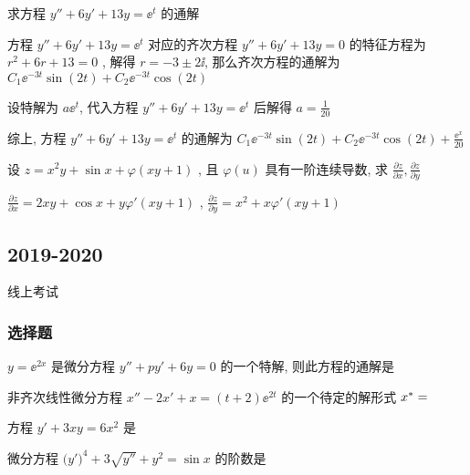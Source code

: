 \begin{ti}
	求方程 $y''+6y'+13y=\ee^t$ 的通解
	\begin{solution}
		方程 $y''+6y'+13y=\ee^t$ 对应的齐次方程 $y''+6y'+13y=0$ 的特征方程为 $r^2+6r+13=0$ , 解得 $r=-3\pm2\ii$, 那么齐次方程的通解为 $C_1\ee^{-3t}\sin(2t)+C_2\ee^{-3t}\cos(2t)$
		
		设特解为 $a\ee^{t}$, 代入方程 $y''+6y'+13y=\ee^t$ 后解得 $a=\frac{1}{20}$
		
		综上, 方程 $y''+6y'+13y=\ee^t$ 的通解为 $C_1\ee^{-3t}\sin(2t)+C_2\ee^{-3t}\cos(2t)+\frac{\ee^x}{20}$
	\end{solution}
\end{ti}

\begin{ti}
	设 $z=x^2y+\sin x+\varphi(xy+1)$ , 且 $\varphi(u)$ 具有一阶连续导数, 求 $\frac{\partial z}{\partial x},\frac{\partial z}{\partial y}$
	\begin{solution}
		$\frac{\partial z}{\partial x}=2xy+\cos x+y\varphi'(xy+1)$ , $\frac{\partial z}{\partial y}=x^2+x\varphi'(xy+1)$
	\end{solution}
\end{ti}

\subsection{2019-2020}
线上考试
\subsubsection{选择题}
\begin{ti}
	$y = \ee^{2x}$ 是微分方程 $y'' + py' + 6y = 0$ 的一个特解, 则此方程的通解是 \kuo
\end{ti}

\begin{ti}
	非齐次线性微分方程 $x'' - 2x' + x = (t+2) \ee^{2t}$ 的一个待定的解形式 $x^* = $ \kuo
\end{ti}

\begin{ti}
	方程 $y' + 3xy = 6x^2$ 是 \kuo
\end{ti}

\begin{ti}
	微分方程 $\bigl(y'\bigr)^4 + 3 \sqrt{y''} + y^2 = \sin x$ 的阶数是 \kuo
\end{ti}

